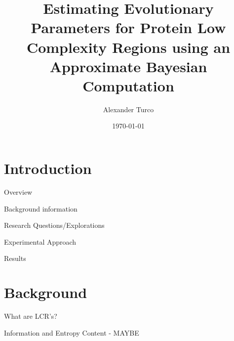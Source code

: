 \documentclass{beamer}
\title[BEAP Dec 2022]{Estimating Evolutionary Parameters for Protein Low Complexity Regions using an Approximate Bayesian Computation}
\author{Alexander Turco}
\date{\today}
\begin{document}
	
	\section{Introduction}
	\begin{frame}
		\titlepage 
	\end{frame}
	
	\logo{}
	
	\begin{frame}{Overview}
		
		\begin{center}
		\begin{minipage}{6cm}
				
		  		\begin{block}{} Background information \end{block}
		  		\begin{block}{} Research Questions/Explorations \end{block}
		  		\begin{block}{} Experimental Approach \end{block}
		  		\begin{block}{} Results \end{block}

		\end{minipage}
		\end{center}
	
	\end{frame}
	
	\section{Background}
	\begin{frame}{What are LCR's?}
		
		
	\end{frame}

	\begin{frame}{Information and Entropy Content - MAYBE }
	
	
	\end{frame}
\end{document}
